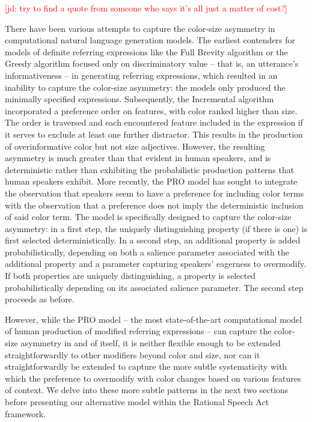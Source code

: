 \documentclass[11pt]{article}
\newcommand{\jd}[1]{\textcolor{Red}{[jd: #1]}}
\begin{document}
\jd{try to find a quote from someone who says it's all just a matter of cost?}

There have been various attempts to capture the color-size asymmetry in computational natural language generation models. The earliest contenders for models of definite referring expressions like the Full Brevity algorithm \cite{Dale1989} or the Greedy algorithm \cite{Dale1989} focused only on discriminatory value -- that is, an utterance's informativeness -- in generating referring expressions, which resulted in an inability to capture the color-size asymmetry: the models only produced the minimally specified expressions. Subsequently, the Incremental algorithm \cite{dale1995} incorporated a preference order on features, with color ranked higher than size. The order is traversed and each encountered feature included in the expression if it serves to exclude at least one further distractor. This results in the production of overinformative color but not size adjectives. However, the resulting asymmetry is much greater than that evident in human speakers, and is deterministic rather than exhibiting the probabilistic production patterns that human speakers exhibit. More recently, the PRO model \cite{GattEtAl2013} has sought to integrate the observation that speakers seem to have a preference for including color terms with the observation that a preference does not imply the deterministic inclusion of said color term. The model is specifically designed to capture the color-size asymmetry: in a first step, the uniquely distinguishing property (if there is one) is first selected deterministically.  In a second step, an additional property is added probabilistically, depending on both a salience parameter associated with the additional property and a parameter capturing speakers' eagerness to overmodify. If both properties are uniquely distinguishing, a property is selected probabilistically depending on its associated salience parameter. The second step proceeds as before.

However, while the PRO model -- the most state-of-the-art computational model of human production of modified referring expressions -- can capture the color-size asymmetry in and of itself, it is neither flexible enough to be extended straightforwardly to other modifiers beyond color and size, nor can it straightforwardly be extended to capture the more subtle systematicity with which the preference to overmodify with color changes based on various features of context. We delve into these more subtle patterns in the next two sections before presenting our alternative model within the Rational Speech Act framework.
\end{document}

